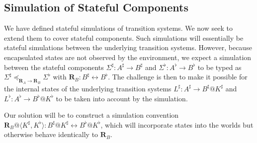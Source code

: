 \documentclass[acmsmall,screen,review,anonymous]{acmart}
\renewcommand{\preceq}{\preccurlyeq}
\begin{document}


\subsection{Simulation of Stateful Components} %

We have defined stateful simulations of transition systems.
We now seek to extend them to cover stateful components.
Such simulations will essentially be
stateful simulations between the underlying transition systems.
However,
because encapsulated states are not observed by the environment,
we expect a simulation between the stateful components
$\Sigma^\sharp : A^\sharp \rightarrow B^\sharp$ and
$\Sigma^\flat : A^\flat \rightarrow B^\flat$
to be typed as
$
  \Sigma^\sharp \preceq_{\mathbf{R}_A \rightarrow \mathbf{R}_B}
  \Sigma^\flat
$
with $\mathbf{R}_B : B^\sharp \leftrightarrow B^\flat$.
The challenge is then to make it possible for
the internal states of the underlying transition systems
$L^\sharp : A^\sharp \rightarrow B^\sharp@K^\sharp$
and
$L^\flat : A^\flat \rightarrow B^\flat@K^\flat$
to be taken into account by the simulation.

Our solution will be to construct a simulation convention
$\mathbf{R}_B@\langle K^\sharp, K^\flat \rangle :
 B^\sharp@K^\sharp \leftrightarrow B^\flat@K^\flat$,
which will incorporate states into the worlds
but otherwise behave identically to $\mathbf{R}_B$.
\end{document}
